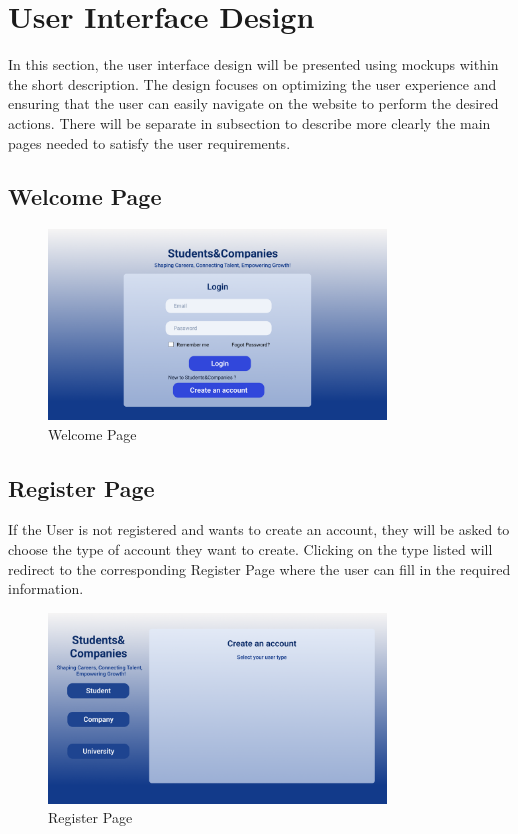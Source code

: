 \section{User Interface Design}
In this section, the user interface design will be presented using mockups within the short description.
The design focuses on optimizing the user experience and ensuring that the user can easily navigate on the website to perform the desired actions.
There will be separate in subsection to describe more clearly the main pages needed to satisfy the user requirements.

\subsection{Welcome Page}

\begin{figure}[H]
    \centering
    \includegraphics[width=0.8\textwidth]{Images/UI/Welcome Page.png}
    \caption{Welcome Page}\label{fig:Welcome_page}
\end{figure}

\subsection{Register Page}
If the User is not registered and wants to create an account, they will be asked to choose the type of account they want to create. 
Clicking on the type listed will redirect to the corresponding Register Page where the user can fill in the required information.
\begin{figure}[H]
    \centering
    \includegraphics[width=0.8\textwidth]{Images/UI/Create account.png}
    \caption{Register Page}\label{fig:Creat_account}
\end{figure}

